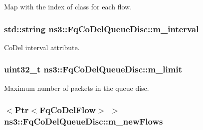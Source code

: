 Map with the index of class for each flow. 

\subsubsection[{\texorpdfstring{m\+\_\+interval}{m_interval}}]{\setlength{\rightskip}{0pt plus 5cm}std\+::string ns3\+::\+Fq\+Co\+Del\+Queue\+Disc\+::m\+\_\+interval\hspace{0.3cm}{\ttfamily [private]}}\hypertarget{classns3_1_1FqCoDelQueueDisc_a4662972dcde7a505bc19b23ebe842de5}{}\label{classns3_1_1FqCoDelQueueDisc_a4662972dcde7a505bc19b23ebe842de5}


Co\+Del interval attribute. 

\subsubsection[{\texorpdfstring{m\+\_\+limit}{m_limit}}]{\setlength{\rightskip}{0pt plus 5cm}uint32\+\_\+t ns3\+::\+Fq\+Co\+Del\+Queue\+Disc\+::m\+\_\+limit\hspace{0.3cm}{\ttfamily [private]}}\hypertarget{classns3_1_1FqCoDelQueueDisc_a7730a22f6e323d171f58aad51d97659c}{}\label{classns3_1_1FqCoDelQueueDisc_a7730a22f6e323d171f58aad51d97659c}


Maximum number of packets in the queue disc. 

\subsubsection[{\texorpdfstring{m\+\_\+new\+Flows}{m_newFlows}}]{$<${\bf Ptr}$<${\bf Fq\+Co\+Del\+Flow}$>$ $>$ ns3\+::\+Fq\+Co\+Del\+Queue\+Disc\+::m\+\_\+new\+Flows\hspace{0.3cm}{\ttfamily [private]}}\hypertarget{classns3_1_1FqCoDelQueueDisc_ae0d12b788b8519457393fa0b37714947}{}\label{classns3_1_1FqCoDelQueueDisc_ae0d12b788b8519457393fa0b37714947}


